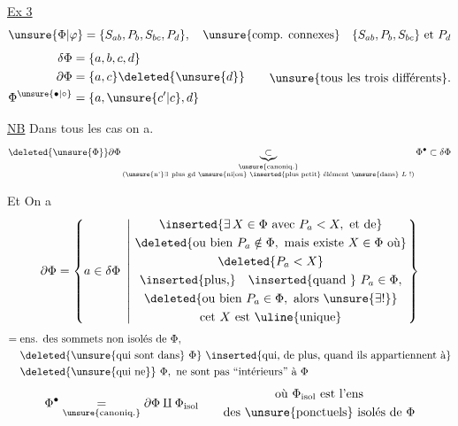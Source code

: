 
\uline{Ex 3}
\[
\unsure{\Phi|\varphi}=\{S_{ab},P_b,S_{bc},P_d\},\quad
\text{\unsure{comp. connexes}}\quad \{S_{ab},P_b,S_{bc}\}\text{ et }P_d
\]
\[
\begin{aligned}
\delta\Phi&=\{a,b,c,d\}\\
\partial\Phi&=\{a,c\}\deleted{\unsure{d}}\\
\Phi^{\unsure{\bullet|\circ}}&=\{a,\unsure{c'|c},d\}
\end{aligned}
\qquad\text{\unsure{tous les trois différents}.}
\]

\uline{NB} Dans tous les cas on a.
\[
\deleted{\unsure{\Phi}}
\partial\Phi\underbrace{\subset}_{\substack{\text{\unsure{canoniq.}}\\
\text{(\unsure{n'}}\exists\ \text{plus gd \unsure{ni|ou} \inserted{plus petit} élément \unsure{dans} }L\text{ !)}}}
\Phi^\bullet\subset\delta\Phi
\]

Et  On a
\[
\partial\Phi=\left\{a\in\delta\Phi\ \left|\
\begin{gathered}
\inserted{\exists\,X\in\Phi\text{ avec }P_a<X,\text{ et de}}\\
\deleted{\text{ou bien }P_a\notin\Phi,\text{ mais existe }X\in\Phi\text{ où}}\\
\deleted{P_a<X}\\
\text{\inserted{plus,}\quad\inserted{quand } }P_a\in\Phi,\\
\deleted{\text{ou bien }P_a\in\Phi,\text{ alors }\unsure{\exists!}}\\
\text{cet }X\text{ est \uline{unique}}
\end{gathered}\right.\right\}
\]
\[
\begin{aligned}
={}&\text{ens. des sommets non isolés de }\Phi,\\
&\deleted{\text{\unsure{qui sont dans} }\Phi}\ \inserted{\text{qui, de plus, quand ils appartiennent à}}\\
&\deleted{\text{\unsure{qui ne}}}\ \Phi,\text{ ne sont pas ``intérieurs'' à }\Phi
\end{aligned}
\]
\[
\Phi^\bullet\underset{\text{\unsure{canoniq.}}}{=}\partial\Phi\amalg\Phi_{\mathrm{isol}}
\qquad
\begin{gathered}
\text{où }\Phi_{\mathrm{isol}}\text{ est l'ens}\\
\text{des \unsure{ponctuels} isolés de }\Phi
\end{gathered}
\]

